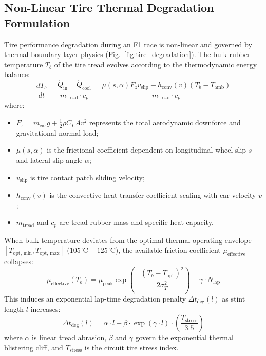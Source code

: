 \documentclass[journal]{IEEEtran}
\begin{document}
\subsection{Non-Linear Tire Thermal Degradation Formulation}
Tire performance degradation during an F1 race is non-linear and governed by thermal boundary layer physics (Fig.~\ref{fig:tire_degradation}). The bulk rubber temperature $T_b$ of the tire tread evolves according to the thermodynamic energy balance:
\begin{equation}
\frac{d T_b}{dt} = \frac{\dot{Q}_{\text{in}} - \dot{Q}_{\text{cool}}}{m_{\text{tread}} \cdot c_p} = \frac{\mu(s, \alpha) F_z v_{\text{slip}} - h_{\text{conv}}(v)(T_b - T_{\text{amb}})}{m_{\text{tread}} \cdot c_p}
\label{eq:thermal_evolution}
\end{equation}
where:
\begin{itemize}
    \item $F_z = m_{\text{car}} g + \frac{1}{2} \rho C_L A v^2$ represents the total aerodynamic downforce and gravitational normal load;
    \item $\mu(s, \alpha)$ is the frictional coefficient dependent on longitudinal wheel slip $s$ and lateral slip angle $\alpha$;
    \item $v_{\text{slip}}$ is tire contact patch sliding velocity;
    \item $h_{\text{conv}}(v)$ is the convective heat transfer coefficient scaling with car velocity $v$;
    \item $m_{\text{tread}}$ and $c_p$ are tread rubber mass and specific heat capacity.
\end{itemize}

When bulk temperature deviates from the optimal thermal operating envelope $[T_{\text{opt, min}}, T_{\text{opt, max}}]$ ($105^\circ\text{C} - 125^\circ\text{C}$), the available friction coefficient $\mu_{\text{effective}}$ collapses:
\begin{equation}
\mu_{\text{effective}}(T_b) = \mu_{\text{peak}} \exp\left( -\frac{(T_b - T_{\text{opt}})^2}{2 \sigma_T^2} \right) - \gamma \cdot N_{\text{lap}}
\label{eq:friction_decay}
\end{equation}
This induces an exponential lap-time degradation penalty $\Delta t_{\text{deg}}(l)$ as stint length $l$ increases:
\begin{equation}
\Delta t_{\text{deg}}(l) = \alpha \cdot l + \beta \cdot \exp(\gamma \cdot l) \cdot \left(\frac{T_{\text{stress}}}{3.5}\right)
\label{eq:deg_penalty}
\end{equation}
where $\alpha$ is linear tread abrasion, $\beta$ and $\gamma$ govern the exponential thermal blistering cliff, and $T_{\text{stress}}$ is the circuit tire stress index.
\end{document}
